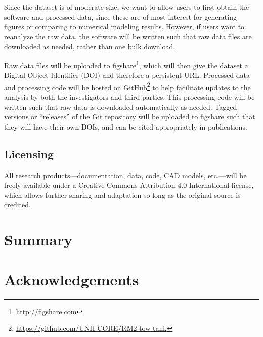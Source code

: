 \documentclass[12pt,letterpaper]{scrreprt}
\begin{document}
Since the dataset is of moderate size, we want to allow users to first
obtain the software and processed data, since these are of most interest for
generating figures or comparing to numerical modeling results. However, if users
want to reanalyze the raw data, the software will be written such that raw data
files are downloaded as needed, rather than one bulk download.

Raw data files will be uploaded to figshare\footnote{\url{http://figshare.com}},
which will then give the dataset a Digital Object Identifier (DOI) and therefore
a persistent URL. Processed data and processing code will be hosted on
GitHub\footnote{\url{https://github.com/UNH-CORE/RM2-tow-tank}} to help
facilitate updates to the analysis by both the investigators and third parties.
This processing code will be written such that raw data is downloaded
automatically as needed. Tagged versions or ``releases'' of the Git repository
will be uploaded to figshare such that they will have their own DOIs, and can be
cited appropriately in publications.

\section{Licensing} 

All research products---documentation, data, code, CAD models, etc.---will be
freely available under a Creative Commons Attribution 4.0 International license,
which allows further sharing and adaptation so long as the original source is
credited.


\chapter{Summary}



\chapter{Acknowledgements}



\renewcommand{\bibname}{References}


\end{document}
